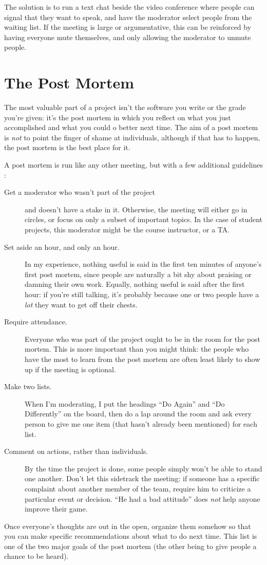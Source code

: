 The solution is to run a text chat beside the video conference where
people can signal that they want to speak, and have the moderator
select people from the waiting list.  If the meeting is large or
argumentative, this can be reinforced by having everyone mute
themselves, and only allowing the moderator to unmute people.

\section*{The Post Mortem}

The most valuable part of a project isn't the software you write or
the grade you're given: it's the post mortem in which you reflect on
what you just accomplished and what you could o better next time.  The
aim of a post mortem is \emph{not} to point the finger of shame at
individuals, although if that has to happen, the post mortem is the
best place for it.

A post mortem is run like any other meeting, but with a few additional
guidelines \cite{Derb2006}:

\begin{description}

\item[Get a moderator who wasn't part of the project] and doesn't have
  a stake in it.  Otherwise, the meeting will either go in circles, or
  focus on only a subset of important topics.  In the case of student
  projects, this moderator might be the course instructor, or a TA.

\item[Set aside an hour, and only an hour.] In my experience, nothing
  useful is said in the first ten minutes of anyone's first post
  mortem, since people are naturally a bit shy about praising or
  damning their own work.  Equally, nothing useful is said after the
  first hour: if you're still talking, it's probably because one or
  two people have a \emph{lot} they want to get off their chests.

\item[Require attendance.] Everyone who was part of the project ought
  to be in the room for the post mortem.  This is more important than
  you might think: the people who have the most to learn from the post
  mortem are often least likely to show up if the meeting is optional.

\item[Make two lists.] When I'm moderating, I put the headings ``Do
  Again'' and ``Do Differently'' on the board, then do a lap around
  the room and ask every person to give me one item (that hasn't
  already been mentioned) for each list.

\item[Comment on actions, rather than individuals.] By the time the
  project is done, some people simply won't be able to stand one
  another.  Don't let this sidetrack the meeting: if someone has a
  specific complaint about another member of the team, require him to
  criticize a particular event or decision.  ``He had a bad attitude''
  does \emph{not} help anyone improve their game.

\end{description}

Once everyone's thoughts are out in the open, organize them somehow so
that you can make specific recommendations about what to do next time.
This list is one of the two major goals of the post mortem (the other
being to give people a chance to be heard).
